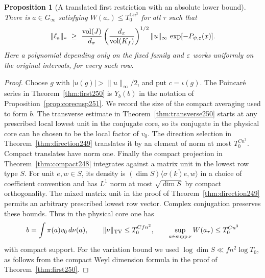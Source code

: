 \documentclass[a4paper,11pt]{article}
\newtheorem{proposition}{Proposition}[section]
\theoremstyle{definition}
\theoremstyle{remark}
\numberwithin{equation}{section}
\begin{document}
\begin{proposition}[A translated first restriction with an absolute lower bound]\leavevmode
\label{prop:poincarenorm261}
There is \(a\in G_\infty\) satisfying
\(W(a_\tau)\le T_0^{C n^3}\) for all \(\tau\) such that
\[
 \|\ell_a\|_*\ \ge\
 \frac{\operatorname{vol}(J)}{d_\sigma}
 \left(\frac{d_\pi}{\operatorname{vol}(K_f)}\right)^{1/2}
       \|u\|_\infty\,\exp[-P_{\psi,\varepsilon}(x)] .
\]
Here a polynomial depending only on the fixed family and \(\varepsilon\)
works uniformly on the original intervals, for every such row.
\end{proposition}
\begin{proof}
Choose \(g\) with \(|u(g)|>\|u\|_\infty/2\), and put \(c=\iota(g)\).
The Poincar\'e series in Theorem~\ref{thm:first250} is \(Y_b(b)\)
in the notation of Proposition~\ref{prop:corecusp251}. We
record the size of the compact averaging used to form \(b\).
The transverse estimate in Theorem~\ref{thm:transverse250}
starts at any prescribed local lowest unit in the conjugate
core, so its conjugate in the physical core can be chosen to
be the local factor of \(v_0\). The direction selection in
Theorem~\ref{thm:direction249} translates it by an element of
norm at most \(T_0^{C n^3}\). Compact translates have norm one.
Finally the compact projection in Theorem~\ref{thm:compact248}
integrates against a matrix unit in the lowest row type \(S\).
For unit \(e,w\in S\), its density is
\((\dim S)\overline{\langle\sigma(k)e,w\rangle}\) in a
choice of coefficient convention and has \(L^1\) norm at most
\(\sqrt{\dim S}\) by compact orthogonality. The mixed matrix
unit in the proof of Theorem~\ref{thm:direction249} permits an
arbitrary prescribed lowest row vector. Complex conjugation
preserves these bounds. Thus in the physical core one has
\[
 b=\int\pi(a)v_0\,d\nu(a),\qquad
 \|\nu\|_{\rm TV}\le T_0^{Cfn^2},\qquad
 \sup_{a\in\operatorname{supp}\nu}W(a_\tau)\le T_0^{C n^3}
\]
with compact support. For the variation bound we used
\(\log\dim S\ll fn^2\log T_0\), as follows from the compact
Weyl dimension formula in the proof of Theorem~\ref{thm:first250}.


\end{proof}
\end{document}
